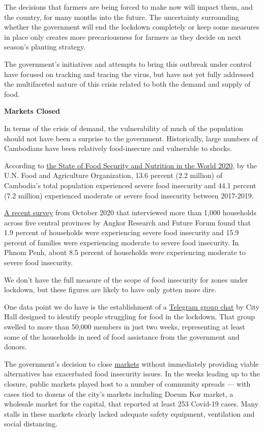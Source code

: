 \documentclass[10pt,a4paper]{letter}
\begin{document}
The decisions that farmers are being forced to make now will impact them, and the country, for many months into the future. The uncertainty surrounding whether the government will end the lockdown completely or keep some measures in place only creates more precariousness for farmers as they decide on next season's planting strategy.

The government's initiatives and attempts to bring this outbreak under control have focused on tracking and tracing the virus, but have not yet fully addressed the multifaceted nature of this crisis related to both the demand and supply of food.

\textbf{Markets Closed}

In terms of the crisis of demand, the vulnerability of much of the population should not have been a surprise to the government. Historically, large numbers of Cambodians have been relatively food-insecure and vulnerable to shocks.

According to \href{https://doi.org/10.4060/ca9692en}{the State of Food Security and Nutrition in the World 2020}, by the U.N. Food and Agriculture Organization, 13.6 percent (2.2 million) of Cambodia's total population experienced severe food insecurity and 44.1 percent (7.2 million) experienced moderate or severe food insecurity between 2017-2019.

\href{http://www.angkorresearch.com/imgs/file/The Effect of Covid-19 Impacts on Cambodian Development_ Headline Results Brief_R3_EN_V4.pdf}{A recent survey} from October 2020 that interviewed more than 1,000 households across five central provinces by Angkor Research and Future Forum found that 1.9 percent of households were experiencing severe food insecurity and 15.9 percent of families were experiencing moderate to severe food insecurity. In Phnom Penh, about 8.5 percent of households were experiencing moderate to severe food insecurity.

We don't have the full measure of the scope of food insecurity for zones under lockdown, but these figures are likely to have only gotten more dire.

One data point we do have is the establishment of a \href{https://t.me/foodsupport}{Telegram group chat} by City Hall designed to identify people struggling for food in the lockdown. That group swelled to more than 50,000 members in just two weeks, representing at least some of the households in need of food assistance from the government and donors.

The government's decision to close \href{https://vodenglish.news/all-phnom-penh-markets-to-be-closed-in-covid-19-lockdown/}{markets} without immediately providing viable alternatives has exacerbated food insecurity issues. In the weeks leading up to the closure, public markets played host to a number of community spreads --- with cases tied to dozens of the city's markets including Doeum Kor market, a wholesale market for the capital, that reported at least 253 Covid-19 cases. Many stalls in these markets clearly lacked adequate safety equipment, ventilation and social distancing.
\end{document}
